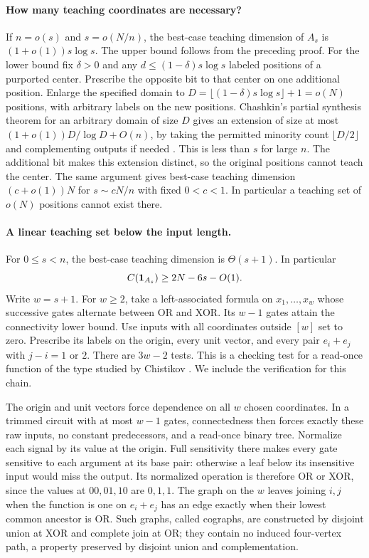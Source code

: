\documentclass[11pt]{article}
\begin{document}
\paragraph{How many teaching coordinates are necessary?}
If $n=o(s)$ and $s=o(N/n)$, the best-case teaching dimension of $A_s$ is $(1+o(1))s\log s$. The upper bound follows from the preceding proof. For the lower bound fix $\delta>0$ and any $d\le(1-\delta)s\log s$ labeled positions of a purported center. Prescribe the opposite bit to that center on one additional position. Enlarge the specified domain to $D=\lfloor(1-\delta)s\log s\rfloor+1=o(N)$ positions, with arbitrary labels on the new positions. Chashkin's partial synthesis theorem for an arbitrary domain of size $D$ gives an extension of size at most $(1+o(1))D/\log D+O(n)$, by taking the permitted minority count $\lfloor D/2\rfloor$ and complementing outputs if needed \cite[Theorem~6.1]{chashkin}. This is less than $s$ for large $n$. The additional bit makes this extension distinct, so the original positions cannot teach the center. The same argument gives best-case teaching dimension $(c+o(1))N$ for $s\sim cN/n$ with fixed $0<c<1$. In particular a teaching set of $o(N)$ positions cannot exist there.

\paragraph{A linear teaching set below the input length.}
For $0\le s<n$, the best-case teaching dimension is $\Theta(s+1)$. In particular
\[
 C({\bf1}_{A_s})\ge 2N-6s-O(1).
\]
Write $w=s+1$. For $w\ge2$, take a left-associated formula on $x_1,\ldots,x_w$ whose successive gates alternate between OR and XOR. Its $w-1$ gates attain the connectivity lower bound. Use inputs with all coordinates outside $[w]$ set to zero. Prescribe its labels on the origin, every unit vector, and every pair $e_i+e_j$ with $j-i=1$ or $2$. There are $3w-2$ tests. This is a checking test for a read-once function of the type studied by Chistikov \cite{chistikov}. We include the verification for this chain.

The origin and unit vectors force dependence on all $w$ chosen coordinates. In a trimmed circuit with at most $w-1$ gates, connectedness then forces exactly these raw inputs, no constant predecessors, and a read-once binary tree. Normalize each signal by its value at the origin. Full sensitivity there makes every gate sensitive to each argument at its base pair: otherwise a leaf below its insensitive input would miss the output. Its normalized operation is therefore OR or XOR, since the values at $00,01,10$ are $0,1,1$. The graph on the $w$ leaves joining $i,j$ when the function is one on $e_i+e_j$ has an edge exactly when their lowest common ancestor is OR. Such graphs, called cographs, are constructed by disjoint union at XOR and complete join at OR; they contain no induced four-vertex path, a property preserved by disjoint union and complementation.
\end{document}
